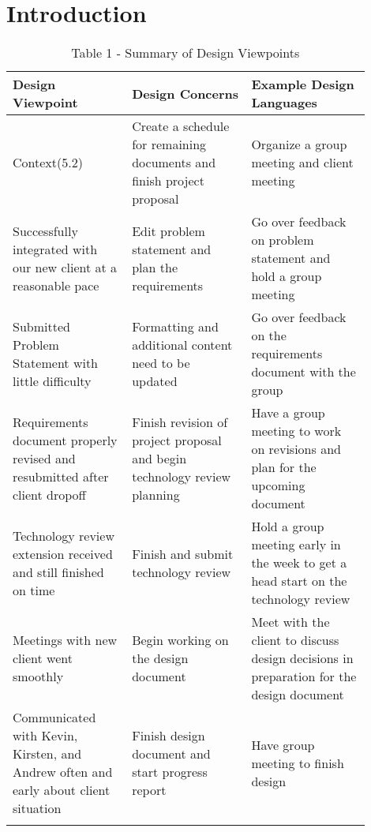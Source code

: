 \documentclass[onecolumn, draftclsnofoot,10pt, compsoc]{IEEEtran}
\begin{document}
\section{Introduction}
\begin{table}[H]
			\caption{Table 1 - Summary of Design Viewpoints}
			\begin{center}
				\begin{tabular}{| p{0.3\linewidth} | p{0.3\linewidth} | p{0.3\linewidth} | }
					\hline
					 \textbf{Design Viewpoint} & \textbf{Design Concerns} & \textbf{Example Design Languages} \\ [0.5ex]
					\hline
					Context(5.2)  & Create a schedule for remaining documents and finish project proposal & Organize a group meeting and client meeting  \\
					\hline
					 Successfully integrated with our new client at a reasonable pace & Edit problem statement and plan the requirements & Go over feedback on problem statement and hold a group meeting \\
					\hline
					 Submitted Problem Statement with little difficulty & Formatting and additional content need to be updated & Go over feedback on the requirements document with the group \\
					\hline
					Requirements document properly revised and resubmitted after client dropoff & Finish revision of project proposal and begin technology review planning & Have a group meeting to work on revisions and plan for the upcoming document\\
					\hline
					Technology review extension received and still finished on time & Finish and submit technology review & Hold a group meeting early in the week to get a head start on the technology review\\
					\hline
					Meetings with new client went smoothly & Begin working on the design document & Meet with the client to discuss design decisions in preparation for the design document  \\
					\hline
					Communicated with Kevin, Kirsten, and Andrew often and early about client situation & Finish design document and start progress report & Have group meeting to finish design \\
					\hline
					& & \\
					\hline
					\hline
					\hline

				\end{tabular}
			\end{center}
			\end{table}
\end{document}
